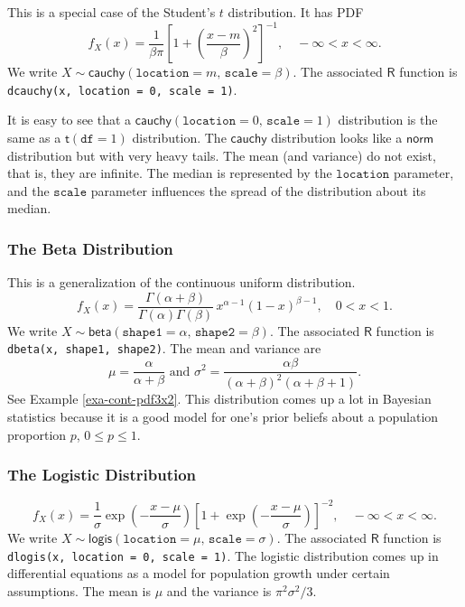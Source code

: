 This is a special case of the Student's \(t\) distribution. It has PDF
\begin{equation}
f_{X}(x) = \frac{1}{\beta\pi} \left[ 1+\left( \frac{x-m}{\beta} \right)^{2} \right]^{-1},\quad -\infty < x < \infty.
\end{equation}
We write \(X \sim \mathsf{cauchy}(\mathtt{location} =
m,\,\mathtt{scale} = \beta)\). The associated \(\mathsf{R}\) function
is \texttt{dcauchy(x, location = 0, scale = 1)}.

It is easy to see that a \(\mathsf{cauchy}(\mathtt{location} =
0,\,\mathtt{scale} = 1)\) distribution is the same as a
\(\mathsf{t}(\mathtt{df}=1)\) distribution. The \(\mathsf{cauchy}\)
distribution looks like a \(\mathsf{norm}\) distribution but with very
heavy tails. The mean (and variance) do not exist, that is, they are
infinite. The median is represented by the \(\mathtt{location}\)
parameter, and the \(\mathtt{scale}\) parameter influences the spread
of the distribution about its median.

\subsubsection{The Beta Distribution}
\label{sec-6-5-3-2}

This is a generalization of the continuous uniform distribution.
\begin{equation}
f_{X}(x)=\frac{\Gamma(\alpha+\beta)}{\Gamma(\alpha)\Gamma(\beta)}\, x^{\alpha-1}(1-x)^{\beta-1},\quad 0 < x < 1.
\end{equation}
We write
\(X\sim\mathsf{beta}(\mathtt{shape1}=\alpha,\,\mathtt{shape2}=\beta)\). The
associated \(\mathsf{R}\) function is \texttt{dbeta(x, shape1, shape2)}. The
mean and variance are
\begin{equation} 
\mu=\frac{\alpha}{\alpha+\beta}\mbox{ and }\sigma^{2}=\frac{\alpha\beta}{\left(\alpha+\beta\right)^{2}\left(\alpha+\beta+1\right)}.
\end{equation}
See Example \ref{exa-cont-pdf3x2}. This distribution comes up a lot in Bayesian
statistics because it is a good model for one's prior beliefs about a
population proportion \(p\), \(0\leq p\leq1\).

\subsubsection{The Logistic Distribution}
\label{sec-6-5-3-3}

\begin{equation}
f_{X}(x)=\frac{1}{\sigma}\exp\left(-\frac{x-\mu}{\sigma}\right)\left[1+\exp\left(-\frac{x-\mu}{\sigma}\right)\right]^{-2},\quad -\infty < x < \infty.
\end{equation}
We write
\(X\sim\mathsf{logis}(\mathtt{location}=\mu,\,\mathtt{scale}=\sigma)\). The
associated \(\mathsf{R}\) function is \texttt{dlogis(x, location = 0, scale =
1)}. The logistic distribution comes up in differential equations as a
model for population growth under certain assumptions. The mean is
\(\mu\) and the variance is \(\pi^{2}\sigma^{2}/3\).

